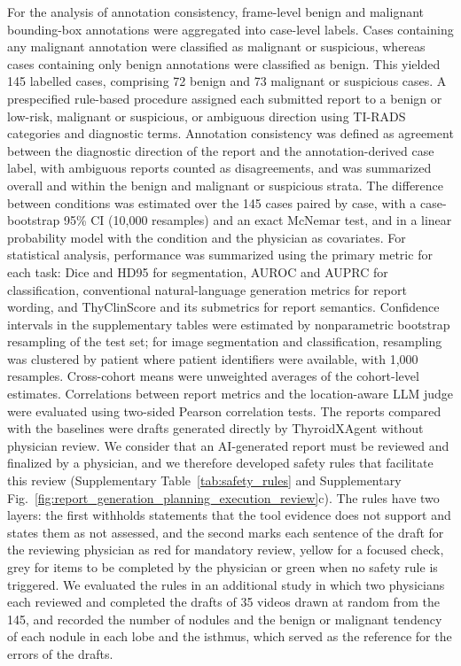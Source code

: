\documentclass[fleqn,10pt]{wlscirep}
\begin{document}
For the analysis of annotation consistency, frame-level benign and malignant bounding-box annotations were aggregated into case-level labels. Cases containing any malignant annotation were classified as malignant or suspicious, whereas cases containing only benign annotations were classified as benign. This yielded 145 labelled cases, comprising 72 benign and 73 malignant or suspicious cases. A prespecified rule-based procedure assigned each submitted report to a benign or low-risk, malignant or suspicious, or ambiguous direction using TI-RADS categories and diagnostic terms. Annotation consistency was defined as agreement between the diagnostic direction of the report and the annotation-derived case label, with ambiguous reports counted as disagreements, and was summarized overall and within the benign and malignant or suspicious strata. The difference between conditions was estimated over the 145 cases paired by case, with a case-bootstrap 95\% CI (10,000 resamples) and an exact McNemar test, and in a linear probability model with the condition and the physician as covariates. For statistical analysis, performance was summarized using the primary metric for each task: Dice and HD95 for segmentation, AUROC and AUPRC for classification, conventional natural-language generation metrics for report wording, and ThyClinScore and its submetrics for report semantics. Confidence intervals in the supplementary tables were estimated by nonparametric bootstrap resampling of the test set; for image segmentation and classification, resampling was clustered by patient where patient identifiers were available, with 1{,}000 resamples. Cross-cohort means were unweighted averages of the cohort-level estimates. Correlations between report metrics and the location-aware LLM judge were evaluated using two-sided Pearson correlation tests.
The reports compared with the baselines were drafts generated directly by ThyroidXAgent without physician review. We consider that an AI-generated report must be reviewed and finalized by a physician, and we therefore developed safety rules that facilitate this review (Supplementary Table~\ref{tab:safety_rules} and Supplementary Fig.~\ref{fig:report_generation_planning_execution_review}c). The rules have two layers: the first withholds statements that the tool evidence does not support and states them as not assessed, and the second marks each sentence of the draft for the reviewing physician as red for mandatory review, yellow for a focused check, grey for items to be completed by the physician or green when no safety rule is triggered. We evaluated the rules in an additional study in which two physicians each reviewed and completed the drafts of 35 videos drawn at random from the 145, and recorded the number of nodules and the benign or malignant tendency of each nodule in each lobe and the isthmus, which served as the reference for the errors of the drafts.
\end{document}
